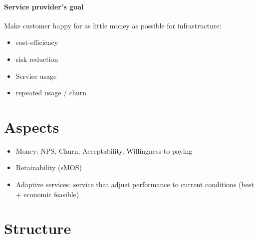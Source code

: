 \paragraph*{Service provider's goal}
Make customer happy for as little money as possible for infrastructure: 
\begin{itemize}
\item cost-efficiency
\item risk reduction
\item Service usage
\item repeated usage / churn
\end{itemize}

\section{Aspects}
\begin{itemize}
\item Money: NPS, Churn, Acceptability, Willingness-to-paying
\item Retainability (sMOS)
\item Adaptive services: service that adjust performance to current conditions (best + economic feasible)
\end{itemize}

\section{Structure}

